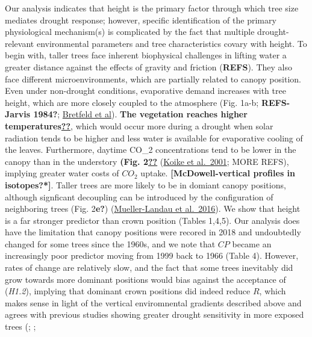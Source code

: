 \documentclass[]{article}
\begin{document}
Our analysis indicates that height is the primary factor through which
tree size mediates drought response; however, specific identification of
the primary physiological mechanism(s) is complicated by the fact that
multiple drought-relevant environmental parameters and tree
characteristics covary with height. To begin with, taller trees face
inherent biophysical challenges in lifting water a greater distance
against the effects of gravity and friction (\textbf{REFS}). They also
face different microenvironments, which are partially related to canopy
position. Even under non-drought conditions, evaporative demand
increases with tree height, which are more closely coupled to the
atmosphere (Fig. 1a-b; \textbf{REFS- Jarvis 1984?};
\href{https://nph-onlinelibrary-wiley-com.smithsonian.idm.oclc.org/doi/full/10.1111/nph.15071}{Bretfeld
et al}). \textbf{The vegetation reaches higher
temperatures\href{https://github.com/SCBI-ForestGEO/McGregor_climate-sensitivity-variation/issues/58}{??}},
which would occur more during a drought when solar radiation tends to be
higher and less water is available for evaporative cooling of the
leaves. Furthermore, daytime CO\_2 concentrations tend to be lower in
the canopy than in the understory \textbf{(Fig.
2\href{https://github.com/SCBI-ForestGEO/McGregor_climate-sensitivity-variation/issues/58}{??}}
(\href{https://watermark.silverchair.com/21-12-13-951.pdf}{Koike et
al.~2001}; MORE REFS), implying greater water costs of \(CO_2\) uptake.
\textbf{{[}McDowell-vertical profiles in isotopes?*{]}}. Taller trees
are more likely to be in domiant canopy positions, although signficant
decoupling can be introduced by the configuration of neighboring trees
(Fig. 2\textbf{e?})
(\href{https://www.ncbi.nlm.nih.gov/pubmed/16643303}{Mueller-Landau et
al.~2016}). We show that height is a far stronger predictor than crown
position (Tables 1,4,5). Our analysis does have the limitation that
canopy positions were recored in 2018 and undoubtedly changed for some
trees since the 1960s, and we note that \(CP\) became an increasingly
poor predictor moving from 1999 back to 1966 (Table 4). However, rates
of change are relatively slow, and the fact that some trees inevitably
did grow towards more dominant positions would bias against the
acceptance of (\emph{H1.2}), implying that dominant crown positions did
indeed reduce \(R\), which makes sense in light of the vertical
enviromnental gradients described above and agrees with previous studies
showing greater drought sensitivity in more exposed trees
(\citep{suarez_factors_2004}; \citep{scharnweber_confessions_2019};
\end{document}
